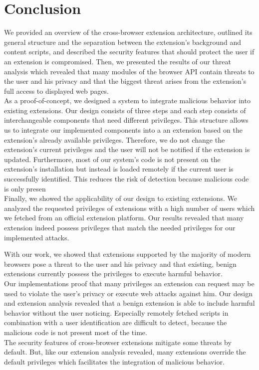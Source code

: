 
\chapter{Conclusion}
\label{chp:conclusion}

	We provided an overview of the cross-browser extension architecture, outlined its general structure and the separation between the extension's background and content scripts, and described the security features that should protect the user if an extension is compromised. Then, we presented the results of our threat analysis which revealed that many modules of the browser API contain threats to the user and his privacy and that the biggest threat arises from the extension's full access to displayed web pages.\\
	As a proof-of-concept, we designed a system to integrate malicious behavior into existing extensions. Our design consists of three steps and each step consists of interchangeable components that need different privileges. This structure allows us to integrate our implemented components into a an extension based on the extension's already available privileges. Therefore, we do not change the extension's current privileges and the user will not be notified if the extension is updated. Furthermore, most of our system's code is not present on the extension's installation but instead is loaded remotely if the current user is successfully identified. This reduces the risk of detection because malicious code is only presen \\	
	Finally, we showed the applicability of our design to existing extensions. We analyzed the requested privileges of extensions with a high number of users which we fetched from an official extension platform. Our results revealed that many extension indeed possess privileges that match the needed privileges for our implemented attacks.
	
	With our work, we showed that extensions supported by the majority of modern browsers pose a threat to the user and his privacy and that existing, benign extensions currently possess the privileges to execute harmful behavior. \\	
	Our implementations proof that many privileges an extension can request may be used to violate the user's privacy or execute web attacks against him. Our design and extension analysis revealed that a benign extension is able to include harmful behavior without the user noticing. Especially remotely fetched scripts in combination with a user identification are difficult to detect, because the malicious code is not present most of the time. \\
	The security features of cross-browser extensions mitigate some threats by default. But, like our extension analysis revealed, many extensions override the default privileges which facilitates the integration of malicious behavior.